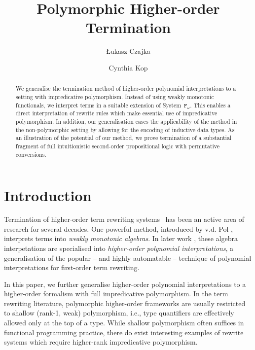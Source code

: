 \documentclass[a4paper,UKenglish,cleveref,autoref,numberwithinsect]{lipics-v2019}
\title{Polymorphic Higher-order Termination}
\author{{\L}ukasz Czajka}{Faculty of Informatics, TU Dortmund, Germany \and \url{http://www.mimuw.edu.pl/~lukaszcz/} }{lukaszcz@mimuw.edu.pl}{https://orcid.org/0000-0001-8083-4280}{}
\author{Cynthia Kop}{Institute of Computer Science, Radboud University Nijmegen, Netherlands \and \url{https://www.cs.ru.nl/~cynthiakop/}}{c.kop@cs.ru.nl}{https://orcid.org/0000-0002-6337-2544}{}
\theoremstyle{definition}
\newcommand{\Fomega}{\mathtt{F}_\omega}
\begin{document}
\maketitle

\begin{abstract}
  We generalise the termination method of higher-order polynomial
  interpretations to a setting with impredicative
  polymorphism. Instead of using weakly monotonic functionals, we
  interpret terms in a suitable extension of System~$\Fomega$. This
  enables a direct interpretation of rewrite rules which make
  essential use of impredicative polymorphism.  In addition, our
  generalisation eases the applicability of the method in the
  non-polymorphic setting by allowing for the encoding of inductive data
  types. As an illustration of the potential of our method, we prove
  termination of a substantial fragment of full intuitionistic
  second-order propositional logic with permutative conversions.
\end{abstract}

\section{Introduction}

Termination of higher-order term rewriting
systems~\cite[Chapter~11]{Terese2003} has been an active area of
research for several decades.
One powerful method, introduced by v.d. Pol \cite{Pol1993,pol:96},
interprets terms into \emph{weakly monotonic algebras}.  In later work
\cite{FuhsKop2012,Kop2012}, these algebra interpetations are specialised
into \emph{higher-order polynomial interpretations}, a generalisation of
the popular -- and highly automatable -- technique of polynomial
interpretations for first-order term rewriting.

In this paper, we further generalise higher-order polynomial
interpretations to a higher-order formalism with full impredicative
polymorphism. In the term rewriting literature, polymorphic
higher-order frameworks are usually restricted to shallow (rank-1,
weak) polymorphism, i.e., type quantifiers are effectively allowed
only at the top of a type. While shallow polymorphism often suffices
in functional programming practice, there do exist interesting
examples of rewrite systems which require higher-rank impredicative
polymorphism.
\end{document}
